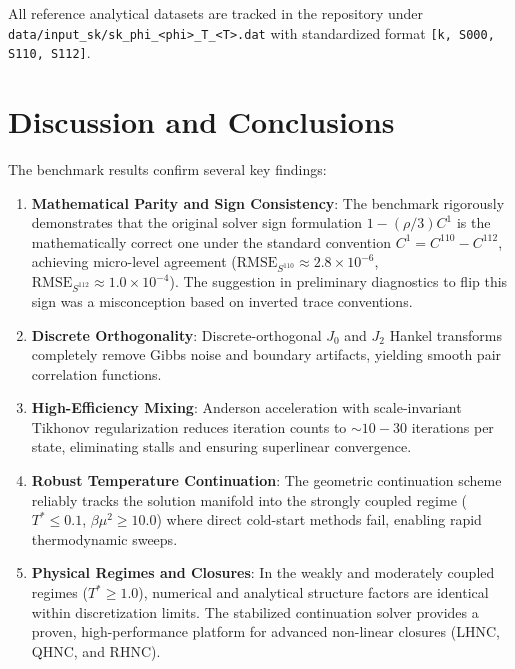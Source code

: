 \documentclass[11pt,a4paper]{article}
\begin{document}
All reference analytical datasets are tracked in the repository under \texttt{data/input\_sk/sk\_phi\_<phi>\_T\_<T>.dat} with standardized format \texttt{[k, S000, S110, S112]}.

\section{Discussion and Conclusions}

The benchmark results confirm several key findings:
\begin{enumerate}
    \item \textbf{Mathematical Parity and Sign Consistency}: The benchmark rigorously demonstrates that the original solver sign formulation $1 - (\rho/3)C^1$ is the mathematically correct one under the standard convention $C^1 = C^{110} - C^{112}$, achieving micro-level agreement ($\text{RMSE}_{S^{110}} \approx 2.8 \times 10^{-6}$, $\text{RMSE}_{S^{112}} \approx 1.0 \times 10^{-4}$). The suggestion in preliminary diagnostics to flip this sign was a misconception based on inverted trace conventions.
    \item \textbf{Discrete Orthogonality}: Discrete-orthogonal $J_0$ and $J_2$ Hankel transforms completely remove Gibbs noise and boundary artifacts, yielding smooth pair correlation functions.
    \item \textbf{High-Efficiency Mixing}: Anderson acceleration with scale-invariant Tikhonov regularization reduces iteration counts to $\sim 10 - 30$ iterations per state, eliminating stalls and ensuring superlinear convergence.
    \item \textbf{Robust Temperature Continuation}: The geometric continuation scheme reliably tracks the solution manifold into the strongly coupled regime ($T^* \le 0.1$, $\beta\mu^2 \ge 10.0$) where direct cold-start methods fail, enabling rapid thermodynamic sweeps.
    \item \textbf{Physical Regimes and Closures}: In the weakly and moderately coupled regimes ($T^* \ge 1.0$), numerical and analytical structure factors are identical within discretization limits. The stabilized continuation solver provides a proven, high-performance platform for advanced non-linear closures (LHNC, QHNC, and RHNC).
\end{enumerate}
\end{document}
